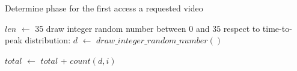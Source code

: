\documentclass[10pt,final,journal,a4paper]{IEEEtran}
\begin{document}


\begin{algorithm}
\caption{Determine phase for the first access a requested video}
\label{alg3}
\begin{algorithmic}[1]

\STATE $len$ $\leftarrow$ 35 
\STATE draw integer random number between $0$ and $35$ respect to time-to-peak distribution: 
$d$ $\leftarrow$ $draw\_integer\_random\_number()$
\ENDFOR

\STATE $total$ $\leftarrow$ $total$ + $count(d,i)$ 
\ENDFOR
{}
\ELSE
{}
\ENDIF
\end{algorithmic}
\end{algorithm}
\end{document}
